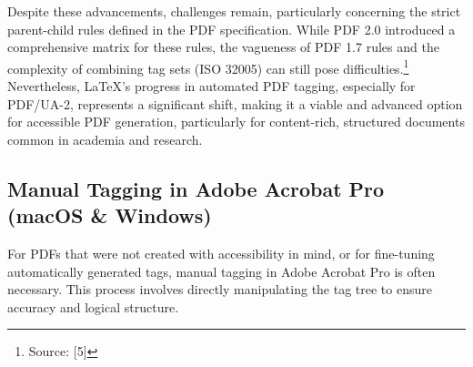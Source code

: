 Despite these advancements, challenges remain, particularly concerning the strict parent-child rules defined in the PDF specification. While PDF 2.0 introduced a comprehensive matrix for these rules, the vagueness of PDF 1.7 rules and the complexity of combining tag sets (ISO 32005) can still pose difficulties.\footnote{Source: [5]} Nevertheless, LaTeX's progress in automated PDF tagging, especially for PDF/UA-2, represents a significant shift, making it a viable and advanced option for accessible PDF generation, particularly for content-rich, structured documents common in academia and research.

\subsection{Manual Tagging in Adobe Acrobat Pro (macOS \& Windows)}

For PDFs that were not created with accessibility in mind, or for fine-tuning automatically generated tags, manual tagging in Adobe Acrobat Pro is often necessary. This process involves directly manipulating the tag tree to ensure accuracy and logical structure.

